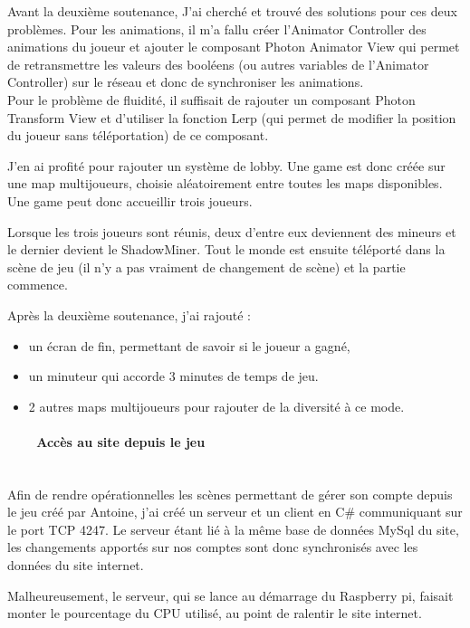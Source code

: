\documentclass[titlepage, 13px, a4paper]{report}
\begin{document}
Avant la deuxième soutenance, J'ai cherché et trouvé des solutions pour ces deux problèmes.
Pour les animations, il m’a fallu créer l’Animator Controller des animations du joueur et ajouter 
le composant Photon Animator View qui permet de retransmettre les valeurs des booléens (ou autres variables 
de l’Animator Controller) sur le réseau et donc de synchroniser les animations. \\

Pour le problème de fluidité, il suffisait de rajouter un composant Photon Transform View et d’utiliser la 
fonction Lerp (qui permet de modifier la position du joueur sans téléportation) de ce composant.

J’en ai profité pour rajouter un système de lobby. Une game est donc créée sur une map multijoueurs, choisie 
aléatoirement entre toutes les maps disponibles. Une game peut donc accueillir trois joueurs.

Lorsque les trois joueurs sont réunis, deux d'entre eux deviennent des mineurs et le dernier devient le ShadowMiner.
Tout le monde est ensuite téléporté dans la scène de jeu (il n’y a pas vraiment de changement de scène) et la partie commence.

Après la deuxième soutenance, j’ai rajouté : \\
{\begin{itemize}
	\item un écran de fin, permettant de savoir si le joueur a gagné,
	\item un minuteur qui accorde 3 minutes de temps de jeu.
	\item 2 autres maps multijoueurs pour rajouter de la diversité à ce mode. \\
\end{itemize}}

\paragraph{~~~~Accès au site depuis le jeu} \hspace{0pt} \\
Afin de rendre opérationnelles les scènes permettant de gérer son compte depuis le jeu créé par Antoine,
j’ai créé un serveur et un client en C\# communiquant sur le port TCP 4247. Le serveur étant lié à la même 
base de données MySql du site, les changements apportés sur nos comptes sont donc synchronisés avec les données du site internet.

Malheureusement, le serveur, qui se lance au démarrage du Raspberry pi, faisait monter le pourcentage 
du CPU utilisé, au point de ralentir le site internet.
\end{document}
